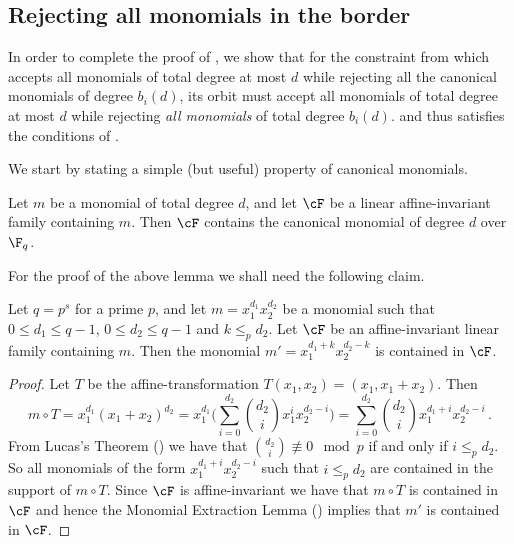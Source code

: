 \subsection{Rejecting all monomials in the border}
\label{ssec:complete}

In order to complete the proof of , we show that for the constraint from 
which accepts all monomials of total degree at most $d$ while rejecting
all the canonical monomials of degree $b_i(d)$,  its orbit must accept all monomials of total degree at most $d$ while rejecting \emph{all monomials} of total degree $b_i(d)$.
%
and thus satisfies the conditions of .

We start by stating a simple (but useful) property of canonical monomials.

\begin{lemma}\label{lem:canonical-monomial}
Let $m$ be a monomial of total degree $d$, and let $\cF$ be a linear affine-invariant family containing $m$. Then $\cF$ contains the canonical monomial of degree $d$ over $\F_q$.
\end{lemma}


For the proof of the above lemma we shall need the following claim.

\begin{claim}\label{lem:canonical-monomial-bivariate}
Let $q = p^s$ for a prime $p$, and
let $m = x_1^{d_1} x_2^{d_2}$ be a monomial such that $0 \leq d_1 \leq q-1$, $0 \leq d_2 \leq q-1$ and $k \leq_p d_2$. Let $\cF$ be an affine-invariant linear family containing $m$.
 Then
the monomial $m' = x_1^{d_1+ k} x_2^{d_2 - k}$ is contained in $\cF$.
\end{claim}

\begin{proof}
Let $T$ be the affine-transformation $T(x_1, x_2) = (x_1, x_1+x_2)$.
Then
\[m \circ T = x_1^{d_1} (x_1+x_2)^{d_2} = x_1^{d_1} \bigg( \sum_{i=0}^{d_2} \binom {d_2} { i} x_1^i x_2^{d_2 - i} \bigg) =
\sum_{i=0}^{d_2} \binom {d_2} {i} x_1^{d_1+i} x_2^{d_2 - i} \,.\]
{}From Lucas's Theorem () we have that $\binom {d_2} {i} \not \equiv 0 \mod p$ if and only if $i \leq_p d_2$.
So all monomials of the form $x_1^{d_1+i} x_2^{d_2 - i}$ such that $i \leq_p d_2$ are contained in the support of
$m \circ T$. 
%
Since $\cF$ is affine-invariant we have that $m \circ T$ is contained in $\cF$ and hence the
%
Monomial Extraction Lemma %
() implies that $m'$ is contained in $\cF$.
\end{proof}



